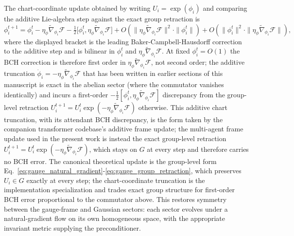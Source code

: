 \documentclass[11pt]{article}
\begin{document}
The chart-coordinate update obtained by writing $U_i = \exp(\phi_i)$ and comparing the additive Lie-algebra step against the exact group retraction is
\begin{equation}
\phi_i^{t+1} = \phi_i^t - \eta_\phi \tilde{\nabla}_{\phi_i} \mathcal{F} - \tfrac{1}{2}\big[\phi_i^t, \eta_\phi \tilde{\nabla}_{\phi_i}\mathcal{F}\big] + O(\|\eta_\phi \tilde{\nabla}_{\phi_i}\mathcal{F}\|^2 \cdot \|\phi_i^t\|) + O(\|\phi_i^t\|^2 \cdot \|\eta_\phi \tilde{\nabla}_{\phi_i}\mathcal{F}\|),
\label{eq:bch_chart_step}
\end{equation}
where the displayed bracket is the leading Baker-Campbell-Hausdorff correction to the additive step and is bilinear in $\phi_i^t$ and $\eta_\phi \tilde{\nabla}_{\phi_i}\mathcal{F}$. At fixed $\phi_i^t = O(1)$ the BCH correction is therefore first order in $\eta_\phi \tilde{\nabla}_{\phi_i}\mathcal{F}$, not second order; the additive truncation $\dot{\phi}_i = -\eta_\phi \tilde{\nabla}_{\phi_i}\mathcal{F}$ that has been written in earlier sections of this manuscript is exact in the abelian sector (where the commutator vanishes identically) and incurs a first-order $-\tfrac{1}{2}[\phi_i^t, \eta_\phi \tilde{\nabla}_{\phi_i}\mathcal{F}]$ discrepancy from the group-level retraction $U_i^{t+1} = U_i^t \exp(-\eta_\phi \tilde{\nabla}_{\phi_i}\mathcal{F})$ otherwise. This additive chart truncation, with its attendant BCH discrepancy, is the form taken by the companion transformer codebase's additive frame update; the multi-agent frame update used in the present work is instead the exact group-level retraction $U_i^{t+1} = U_i^t \exp(-\eta_\phi \tilde{\nabla}_{\phi_i}\mathcal{F})$, which stays on $G$ at every step and therefore carries no BCH error. The canonical theoretical update is the group-level form Eq.~\eqref{eq:gauge_natural_gradient}-\eqref{eq:gauge_group_retraction}, which preserves $U_i \in G$ exactly at every step; the chart-coordinate truncation is the implementation specialization and trades exact group structure for first-order BCH error proportional to the commutator above. This restores symmetry between the gauge-frame and Gaussian sectors: each sector evolves under a natural-gradient flow on its own homogeneous space, with the appropriate invariant metric supplying the preconditioner.
\end{document}
